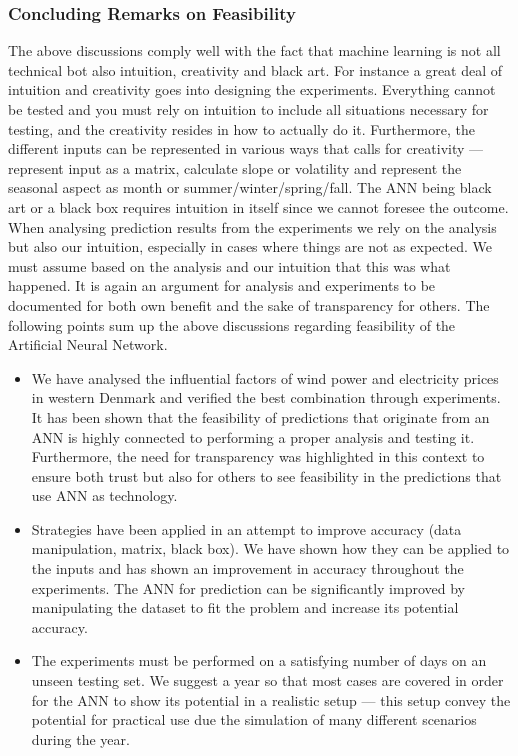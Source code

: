 \subsubsection{Concluding Remarks on Feasibility}
The above discussions comply well with the fact that machine learning is not all technical bot also intuition, creativity and black art\cite{18}. For instance a great deal of intuition and creativity goes into designing the experiments. Everything cannot be tested and you must rely on intuition to include all situations necessary for testing, and the creativity resides in how to actually do it. Furthermore, the different inputs can be represented in various ways that calls for creativity --- represent input as a matrix, calculate slope or volatility and represent the seasonal aspect as month or summer/winter/spring/fall. The ANN being black art or a black box requires intuition in itself since we cannot foresee the outcome. When analysing prediction results from the experiments we rely on the analysis but also our intuition, especially in cases where things are not as expected. We must assume based on the analysis and our intuition that this was what happened. It is again an argument for analysis and experiments to be documented for both own benefit and the sake of transparency for others. The following points sum up the above discussions regarding feasibility of the Artificial Neural Network.

\begin{itemize}
\item We have analysed the influential factors of wind power and electricity prices in western Denmark and verified the best combination through experiments. It has been shown that the feasibility of predictions that originate from an ANN is highly connected to performing a proper analysis and testing it. Furthermore, the need for transparency was highlighted in this context to ensure both trust but also for others to see feasibility in the predictions that use ANN as technology.
\item Strategies have been applied in an attempt to improve accuracy (data manipulation, matrix, black box). We have shown how they can be applied to the inputs and has shown an improvement in accuracy throughout the experiments. The ANN for prediction can be significantly improved by manipulating the dataset to fit the problem and increase its potential accuracy.
\item The experiments must be performed on a satisfying number of days on an unseen testing set. We suggest a year so that most cases are covered in order for the ANN to show its potential in a realistic setup --- this setup convey the potential for practical use due the simulation of many different scenarios during the year. 
\end{itemize}

